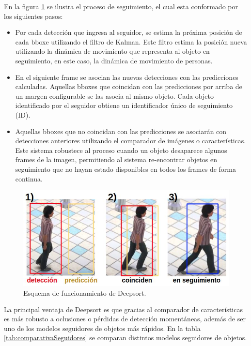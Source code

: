 En la figura \ref{fig:deepsortProcess} se ilustra el proceso de seguimiento, el cual esta conformado por los siguientes pasos:
\begin{itemize}
\item Por cada detección que ingresa al seguidor, se estima la próxima posición de cada bboxe utilizando el filtro de Kalman. Este filtro estima la posición nueva utilizando la dinámica de movimiento que representa al objeto en seguimiento, en este caso, la dinámica de movimiento de personas.
\item En el siguiente frame se asocian las nuevas detecciones con las predicciones calculadas. Aquellas bboxes que coincidan con las predicciones por arriba de un margen configurable se las asocia al mismo objeto. Cada objeto identificado por el seguidor obtiene un identificador único de seguimiento (ID).
\item Aquellas bboxes que no coincidan con las predicciones se asociarán con detecciones anteriores utilizando el comparador de imágenes o características. Este sistema robustece al proceso cuando un objeto desaparece algunos frames de la imagen, permitiendo al sistema re-encontrar objetos en seguimiento que no hayan estado disponibles en todos los frames de forma continua.
\end{itemize}

\begin{figure}[ht]
	\centering
	\includegraphics[scale=.65]{./Figures/deepsortProcess.jpg}
	\caption{Esquema de funcionamiento de Deepsort.}
	\label{fig:deepsortProcess}
\end{figure}

La principal ventaja de Deepsort es que gracias al comparador de características es más robusto a oclusiones o pérdidas de detección momentáneas, además de ser uno de los modelos seguidores de objetos más rápidos. En la tabla \ref{tab:comparativaSeguidores} se comparan distintos modelos seguidores de objetos.

